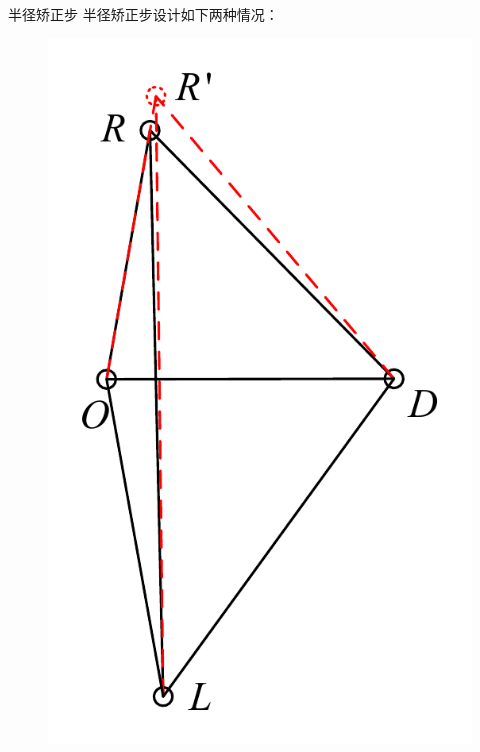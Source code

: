 \documentclass[aspectratio=169]{beamer}
\begin{document}
\begin{frame}{半径矫正步}
    半径矫正步设计如下两种情况：
    \begin{figure}[!ht]
        \centering
        \begin{minipage}[t]{0.2\textwidth}
            \centering
            \includegraphics[width=\textwidth]{图片/半径矫正步1.pdf}
        \end{minipage}
        \hspace{0.1\textwidth}
        \begin{minipage}[t]{0.3\textwidth}
            \centering

\end{minipage}
\end{figure}
\end{frame}
\end{document}
